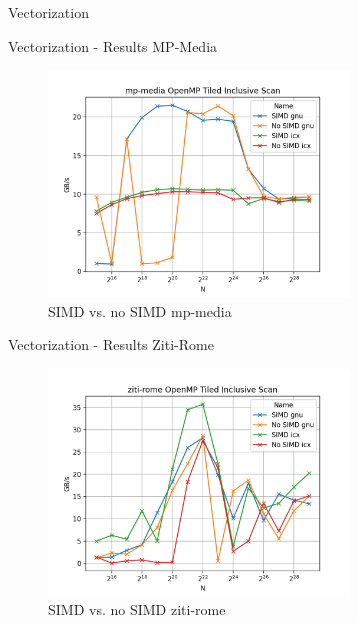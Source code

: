 \begin{frame}{Vectorization}
\end{frame} 

\begin{frame}{Vectorization - Results MP-Media}
	\begin{figure}
		\includegraphics[width=80mm]{graphs/mp-media OpenMP Tiled Inclusive Scan.png}
		\caption{{SIMD vs. no SIMD mp-media}}
	\end{figure}
\end{frame}

\begin{frame}{Vectorization - Results Ziti-Rome}
	\begin{figure}
		\includegraphics[width=80mm]{graphs/ziti-rome OpenMP Tiled Inclusive Scan.png}
		\caption{{SIMD vs. no SIMD ziti-rome}}
	\end{figure}
\end{frame}